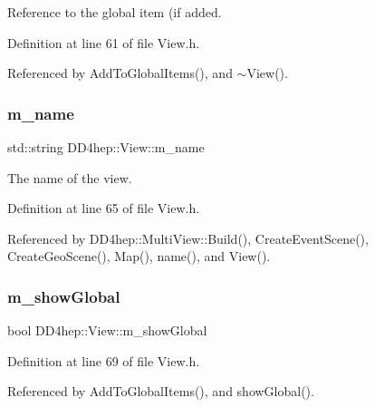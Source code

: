 Reference to the global item (if added. 



Definition at line 61 of file View.\+h.



Referenced by Add\+To\+Global\+Items(), and $\sim$\+View().

\hypertarget{class_d_d4hep_1_1_view_ac43b9e8f976a9731ff808cd6f7fc1ce7}{}\label{class_d_d4hep_1_1_view_ac43b9e8f976a9731ff808cd6f7fc1ce7} 
\subsubsection{\texorpdfstring{m\+\_\+name}{m\_name}}
{\footnotesize\ttfamily std\+::string D\+D4hep\+::\+View\+::m\+\_\+name\hspace{0.3cm}{\ttfamily [protected]}}



The name of the view. 



Definition at line 65 of file View.\+h.



Referenced by D\+D4hep\+::\+Multi\+View\+::\+Build(), Create\+Event\+Scene(), Create\+Geo\+Scene(), Map(), name(), and View().

\hypertarget{class_d_d4hep_1_1_view_ab3ae217421de575d8db2a4eed72b8629}{}\label{class_d_d4hep_1_1_view_ab3ae217421de575d8db2a4eed72b8629} 
\subsubsection{\texorpdfstring{m\+\_\+show\+Global}{m\_showGlobal}}
{\footnotesize\ttfamily bool D\+D4hep\+::\+View\+::m\+\_\+show\+Global\hspace{0.3cm}{\ttfamily [protected]}}



Definition at line 69 of file View.\+h.



Referenced by Add\+To\+Global\+Items(), and show\+Global().

\hypertarget{class_d_d4hep_1_1_view_a6792e4acf7d115519d5390959e7c0306}{}\label{class_d_d4hep_1_1_view_a6792e4acf7d115519d5390959e7c0306} 
